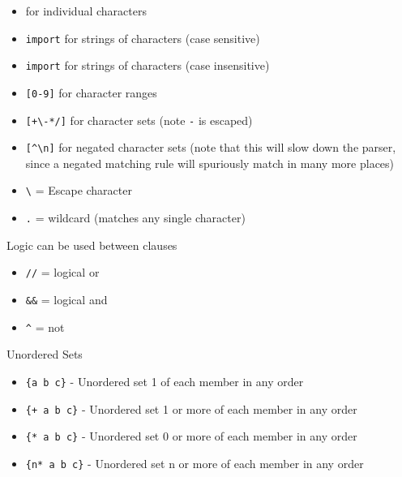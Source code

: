 \begin{itemize}
\item \texttt{\textquotesingle{}{[}\textquotesingle{}} for individual characters

\item \texttt{\textquotedbl{}import\textquotedbl{}} for strings of characters (case sensitive)

\item \texttt{\textquotesingle{}import\textquotesingle{}} for strings of characters (case insensitive)

\item \texttt{{[}0-9{]}} for character ranges

\item \texttt{{[}+\textbackslash{}-*/{]}} for character sets (note \texttt{-} is escaped)

\item \texttt{{[}\^{}\textbackslash{}n{]}} for negated character sets (note that this will slow down the parser,
since a negated matching rule will spuriously match in many more places)

\item \texttt{\textbackslash{}} = Escape character

\item \texttt{.} = wildcard (matches any single character)

\end{itemize}

Logic can be used between clauses

\begin{itemize}
\item \texttt{//} = logical or

\item \texttt{\&\&} = logical and

\item \texttt{\^{}} = not

\end{itemize}

Unordered Sets

\begin{itemize}
\item \texttt{\{a b c\}} - Unordered set 1 of each member in any order

\item \texttt{\{+ a b c\}} - Unordered set 1 or more of each member in any order

\item \texttt{\{* a b c\}} - Unordered set 0 or more of each member in any order

\item \texttt{\{n* a b c\}} - Unordered set n or more of each member in any order

\end{itemize}

